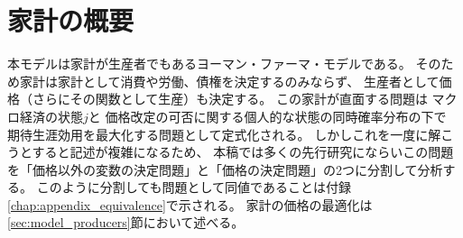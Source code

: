 
\section{家計の概要}
\label{sec:sec_households_overview}
本モデルは家計が生産者でもあるヨーマン・ファーマ・モデルである。
そのため家計は家計として消費や労働、債権を決定するのみならず、
生産者として価格（さらにその関数として生産）も決定する。
この家計が直面する問題は
マクロ経済の状態\(j\)と
価格改定の可否に関する個人的な状態の同時確率分布の下で
期待生涯効用を最大化する問題として定式化される。
しかしこれを一度に解こうとすると記述が複雑になるため、
本稿では多くの先行研究にならいこの問題を「価格以外の変数の決定問題」と「価格の決定問題」の2つに分割して分析する。
このように分割しても問題として同値であることは付録\ref{chap:appendix_equivalence}で示される。
家計の価格の最適化は\ref{sec:model_producers}節において述べる。